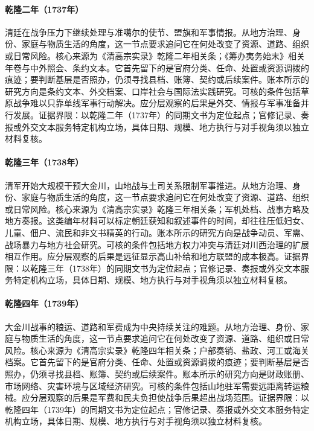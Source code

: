 \hypertarget{social:EQ-1737-Dzungar-NEGOTIATION}{}\paragraph{乾隆二年（1737年）}清廷在战争压力下继续处理与准噶尔的使节、盟旗和军事情报。从地方治理、身份、家庭与物质生活的角度，这一节点要求追问它在何处改变了资源、道路、组织或日常风险。核心来源为《清高宗实录》乾隆二年相关条；《筹办夷务始末》相关年卷与中外照会、条约文本。它首先留下的是官府分类、任命、处置或资源调拨的痕迹；要判断基层是否照办，仍须寻找县档、账簿、契约或后续案件。账本所示的研究方向是条约文本、外交档案、口岸社会与国际法实践研究。可核的条件包括草原战争难以只靠单线军事行动解决。应分层观察的后果是外交、情报与军事准备并行发展。证据界限：以乾隆二年（1737年）的同期文书为定位起点；官修记录、奏报或外交文本服务特定机构立场，具体日期、规模、地方执行与对手视角须以独立材料复核。
\hypertarget{social:EQ-1738-FIRST-JINCHUAN-WAR}{}\paragraph{乾隆三年（1738年）}清军开始大规模干预大金川，山地战与土司关系限制军事推进。从地方治理、身份、家庭与物质生活的角度，这一节点要求追问它在何处改变了资源、道路、组织或日常风险。核心来源为《清高宗实录》乾隆三年相关条；军机处档、战事方略及地方奏报。这类编年材料可以标定朝廷获知和叙述事件的时间，却往往压低妇女、儿童、佃户、流民和非文书精英的行动。账本所示的研究方向是战争动员、军需、战场暴力与地方社会研究。可核的条件包括地方权力冲突与清廷对川西治理的扩展相互作用。应分层观察的后果是远征显示高山补给和地方联盟的成本极高。证据界限：以乾隆三年（1738年）的同期文书为定位起点；官修记录、奏报或外交文本服务特定机构立场，具体日期、规模、地方执行与对手视角须以独立材料复核。
\hypertarget{social:EQ-1739-JINCHUAN-SUPPLY}{}\paragraph{乾隆四年（1739年）}大金川战事的粮运、道路和军费成为中央持续关注的难题。从地方治理、身份、家庭与物质生活的角度，这一节点要求追问它在何处改变了资源、道路、组织或日常风险。核心来源为《清高宗实录》乾隆四年相关条；户部奏销、盐政、河工或海关档案。它首先留下的是官府分类、任命、处置或资源调拨的痕迹；要判断基层是否照办，仍须寻找县档、账簿、契约或后续案件。账本所示的研究方向是财政账册、市场网络、灾害环境与区域经济研究。可核的条件包括山地驻军需要远距离转运粮械。应分层观察的后果是军费和民夫负担使战争后果超出战场范围。证据界限：以乾隆四年（1739年）的同期文书为定位起点；官修记录、奏报或外交文本服务特定机构立场，具体日期、规模、地方执行与对手视角须以独立材料复核。
